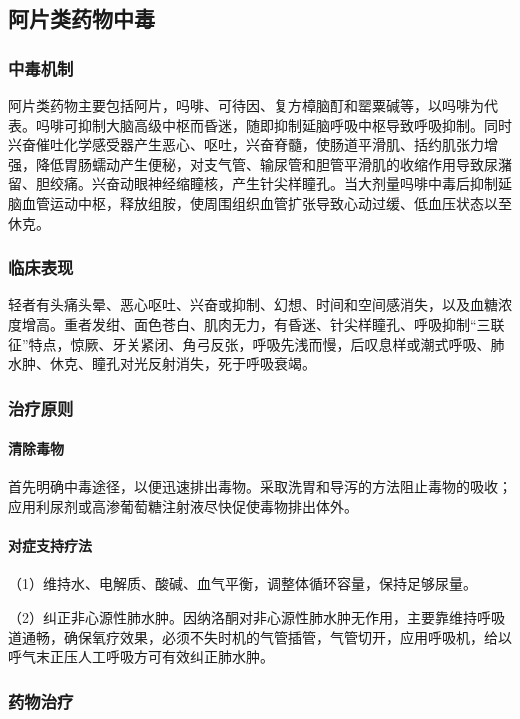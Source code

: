 \subsection{阿片类药物中毒}

\subsubsection{中毒机制}

阿片类药物主要包括阿片，吗啡、可待因、复方樟脑酊和罂粟碱等，以吗啡为代表。吗啡可抑制大脑高级中枢而昏迷，随即抑制延脑呼吸中枢导致呼吸抑制。同时兴奋催吐化学感受器产生恶心、呕吐，兴奋脊髓，使肠道平滑肌、括约肌张力增强，降低胃肠蠕动产生便秘，对支气管、输尿管和胆管平滑肌的收缩作用导致尿潴留、胆绞痛。兴奋动眼神经缩瞳核，产生针尖样瞳孔。当大剂量吗啡中毒后抑制延脑血管运动中枢，释放组胺，使周围组织血管扩张导致心动过缓、低血压状态以至休克。

\subsubsection{临床表现}

轻者有头痛头晕、恶心呕吐、兴奋或抑制、幻想、时间和空间感消失，以及血糖浓度增高。重者发绀、面色苍白、肌肉无力，有昏迷、针尖样瞳孔、呼吸抑制“三联征”特点，惊厥、牙关紧闭、角弓反张，呼吸先浅而慢，后叹息样或潮式呼吸、肺水肿、休克、瞳孔对光反射消失，死于呼吸衰竭。

\subsubsection{治疗原则}
\paragraph{清除毒物}

首先明确中毒途径，以便迅速排出毒物。采取洗胃和导泻的方法阻止毒物的吸收；应用利尿剂或高渗葡萄糖注射液尽快促使毒物排出体外。
\paragraph{对症支持疗法}

（1）维持水、电解质、酸碱、血气平衡，调整体循环容量，保持足够尿量。

（2）纠正非心源性肺水肿。因纳洛酮对非心源性肺水肿无作用，主要靠维持呼吸道通畅，确保氧疗效果，必须不失时机的气管插管，气管切开，应用呼吸机，给以呼气末正压人工呼吸方可有效纠正肺水肿。

\subsubsection{药物治疗}
